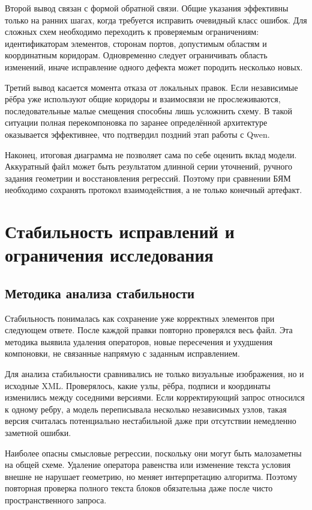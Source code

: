 \documentclass[a4paper,12pt]{extreport}
\begin{document}
Второй вывод связан с формой обратной связи. Общие указания эффективны только на ранних шагах, когда требуется исправить очевидный класс ошибок. Для сложных схем необходимо переходить к проверяемым ограничениям: идентификаторам элементов, сторонам портов, допустимым областям и координатным коридорам. Одновременно следует ограничивать область изменений, иначе исправление одного дефекта может породить несколько новых.

Третий вывод касается момента отказа от локальных правок. Если независимые рёбра уже используют общие коридоры и взаимосвязи не прослеживаются, последовательные малые смещения способны лишь усложнить схему. В такой ситуации полная перекомпоновка по заранее определённой архитектуре оказывается эффективнее, что подтвердил поздний этап работы с Qwen.

Наконец, итоговая диаграмма не позволяет сама по себе оценить вклад модели. Аккуратный файл может быть результатом длинной серии уточнений, ручного задания геометрии и восстановления регрессий. Поэтому при сравнении БЯМ необходимо сохранять протокол взаимодействия, а не только конечный артефакт.

\section{Стабильность исправлений и ограничения исследования}

\subsection{Методика анализа стабильности}

Стабильность понималась как сохранение уже корректных элементов при следующем ответе. После каждой правки повторно проверялся весь файл. Эта методика выявила удаления операторов, новые пересечения и ухудшения компоновки, не связанные напрямую с заданным исправлением.

Для анализа стабильности сравнивались не только визуальные изображения, но и исходные XML. Проверялось, какие узлы, рёбра, подписи и координаты изменились между соседними версиями. Если корректирующий запрос относился к одному ребру, а модель переписывала несколько независимых узлов, такая версия считалась потенциально нестабильной даже при отсутствии немедленно заметной ошибки.

Наиболее опасны смысловые регрессии, поскольку они могут быть малозаметны на общей схеме. Удаление оператора равенства или изменение текста условия внешне не нарушает геометрию, но меняет интерпретацию алгоритма. Поэтому повторная проверка полного текста блоков обязательна даже после чисто пространственного запроса.
\end{document}
